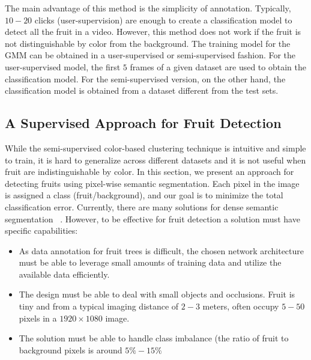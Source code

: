 The main advantage of this method is the simplicity of annotation. Typically, $10-20$ clicks (user-supervision) are enough to create a classification model to detect all the fruit in a video. However, this method does not work if the fruit is not distinguishable by color from the background. The training model for the GMM can be obtained in a user-supervised or semi-supervised fashion. For the user-supervised model, the first $5$ frames of a given dataset are used to obtain the classification model. For the semi-supervised version, on the other hand, the classification model is obtained from a dataset different from the test sets.


\subsection{A Supervised Approach for Fruit Detection}\label{subsec:unetdetection}
While the semi-supervised color-based clustering technique is intuitive and simple to train, it is hard to generalize across different datasets and it is not useful when fruit are indistinguishable by color. In this section, we present an approach for detecting fruits using pixel-wise semantic segmentation. Each pixel in the image is assigned a class (fruit/background), and our goal is to minimize the total classification error. Currently, there are many solutions for dense semantic segmentation ~\cite{long_fully_2015,badrinarayanan2017segnet}. However, to be effective for fruit detection a solution must have specific capabilities:

\begin{itemize}
    \item As data annotation for fruit trees is difficult, the chosen network architecture must be able to leverage small amounts of training data and utilize the available data efficiently.
    
    \item The design must be able to deal with small objects and occlusions. Fruit is tiny and from a typical imaging distance of $2-3$ meters, often occupy $5 - 50$ pixels in a $1920 \times 1080$ image.
    
    \item The solution must be able to handle class imbalance (the ratio of fruit to background pixels is around $5\% - 15\%$
\end{itemize}

